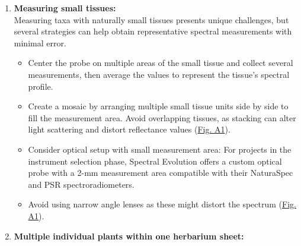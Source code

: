 \documentclass[
  letterpaper,
  DIV=11,
  numbers=noendperiod]{scrreprt}
\providecommand{\tightlist}{%
  \setlength{\itemsep}{0pt}\setlength{\parskip}{0pt}}
\begin{document}
\begin{enumerate}
  \begin{itemize}
  \tightlist
  \item
    Tissues with glue.\\
  \item
    Tissues attached to herbarium paper such that no black background
    can be inserted beneath the tissue.\\
  \item
    Tissues that are not pressed flat (e.g., deformed, folded, crumpled,
    or abnormal leaves).\\
  \item
    Tissues contaminated by biotic or abiotic agents (e.g., algae,
    lichen, fungus, chemical preservatives, glue).\\
  \item
    Damaged tissues (e.g., by herbivory, pathogens, herborization
    phenomena).\\
  \item
    Midribs and major venation in the leaves, or other types of
    vasculature or intrusions in target tissue.\\
  \item
    If larger tissues are available, avoid smaller tissues that don't
    cover the entire optical probe measurement area.
  \end{itemize}
\item
  \textbf{Measuring small tissues:}\\
  Measuring taxa with naturally small tissues presents unique
  challenges, but several strategies can help obtain representative
  spectral measurements with minimal error.

  \begin{itemize}
  \tightlist
  \item
    Center the probe on multiple areas of the small tissue and collect
    several measurements, then average the values to represent the
    tissue's spectral profile.\\
  \item
    Create a mosaic by arranging multiple small tissue units side by
    side to fill the measurement area. Avoid overlapping tissues, as
    stacking can alter light scattering and distort reflectance values
    (\hyperref[fa1]{Fig. A1}).\\
  \item
    Consider optical setup with small measurement area: For projects in
    the instrument selection phase, Spectral Evolution offers a custom
    optical probe with a 2-mm measurement area compatible with their
    NaturaSpec and PSR spectroradiometers.\\
  \item
    Avoid using narrow angle lenses as these might distort the spectrum
    (\hyperref[fa1]{Fig. A1}).
  \end{itemize}
\item
  \textbf{Multiple individual plants within one herbarium sheet:}


\end{enumerate}
\end{document}
